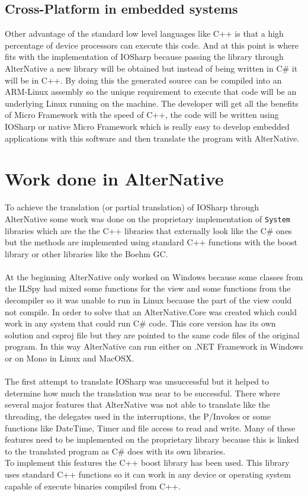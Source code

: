 \subsection{Cross-Platform in embedded systems}\label{SS:AN-Use-Cases-NETMF}
Other advantage of the standard low level languages like C++ is that a high percentage of device processors can execute this code. And at this point is where fits with the implementation of IOSharp because passing the library through AlterNative a new library will be obtained but instead of being written in C\# it will be in C++. By doing this the generated source can be compiled into an ARM-Linux assembly so the unique requirement to execute that code will be an underlying Linux running on the machine. The developer will get all the benefits of Micro Framework with the speed of C++, the code will be written using IOSharp or native Micro Framework which is really easy to develop embedded applications with this software and then translate the program with AlterNative.

\section{Work done in AlterNative}\label{AN-WorkDone}
To achieve the translation (or partial translation) of IOSharp through AlterNative some work was done on the proprietary implementation of \verb!System! libraries which are the the C++ libraries that externally look like the C\# ones but the methods are implemented using standard C++ functions with the boost library or other libraries like the Boehm GC.
\\
\\
At the beginning AlterNative only worked on Windows because some classes from the ILSpy had mixed some functions for the view and some functions from the decompiler so it was unable to run in Linux because the part of the view could not compile. In order to solve that an AlterNative.Core was created which could work in any system that could run C\# code. This core version has its own solution and csproj file but they are pointed to the same code files of the original program. In this way AlterNative can run either on .NET Framework in Windows or on Mono in Linux and MacOSX.
\\
\\
The first attempt to translate IOSharp was unsuccessful but it helped to determine how much the translation was near to be successful. There where several major features that AlterNative was not able to translate like the threading, the delegates used in the interruptions, the P/Invokes or some functions like DateTime, Timer and file access to read and write. Many of these features need to be implemented on the proprietary library because this is linked to the translated program as C\# does with its own libraries.
\\
To implement this features the C++ boost library has been used. This library uses standard C++ functions so it can work in any device or operating system capable of execute binaries compiled from C++.

